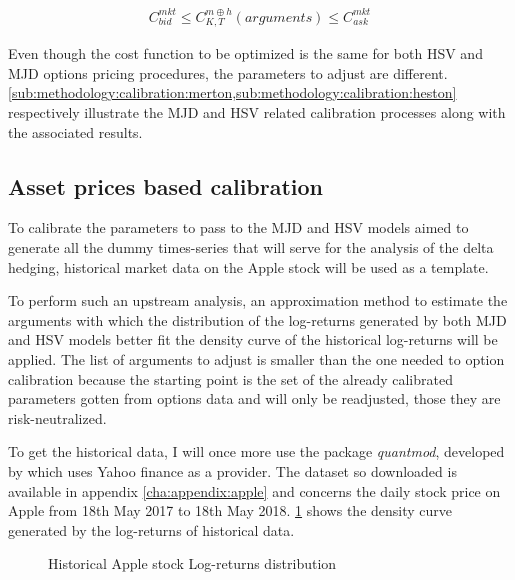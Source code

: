 \documentclass[12pt]{report}
\begin{document}
\begin{align}
  C_{bid}^{mkt} \leq C_{K,T}^{m \oplus h}(arguments)  \leq C_{ask}^{mkt}
 \label{eq:methodology:bidask}
\end{align}

Even though the cost function to be optimized is the same for both HSV and MJD options pricing procedures, the parameters to adjust are different. \cref{sub:methodology:calibration:merton,sub:methodology:calibration:heston} respectively illustrate the  MJD and HSV related calibration processes along with the associated results.


\subsection{Asset prices based calibration}
\label{sub:methodology:calibration:asset}

To calibrate the parameters to pass to the MJD and HSV models aimed to generate all the dummy times-series that will serve for the analysis of the delta hedging, historical market data on the Apple stock will be used as a template.

To perform such an upstream analysis, an approximation method to estimate the arguments with which the distribution of the log-returns generated by both MJD and HSV models better fit the density curve of the historical log-returns will be applied.
The list of arguments to adjust is smaller than the one needed to option calibration because the starting point is the set of the already calibrated parameters gotten from options data and will only be readjusted, those they are risk-neutralized.

To get the historical data, I will once more use the package \textit{quantmod}, developed by \citet{quantmod} which uses Yahoo finance as a provider. The dataset so downloaded is available in appendix \ref{cha:appendix:apple} and concerns the daily stock price on Apple from 18th May 2017 to 18th May 2018.
\cref{p:methodology:density:aapl} shows the density curve generated by the log-returns of historical data.

\begin{figure}[ht]
  \centering
  
  \caption{Historical Apple stock Log-returns distribution}
  \label{p:methodology:density:aapl}
\end{figure}
\end{document}
